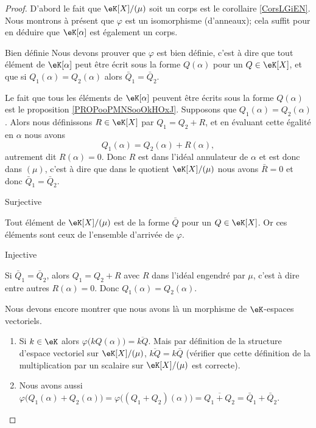 \begin{proof}
    D'abord le fait que \( \eK[X]/(\mu)\) soit un corps est le corollaire \ref{CorsLGiEN}. Nous montrons à présent que \( \varphi\) est un isomorphisme (d'anneaux); cela suffit pour en déduire que \( \eK[\alpha]\) est également un corps.
    \begin{subproof}
        \item[Bien définie]
            Nous devons prouver que \( \varphi\) est bien définie, c'est à dire que tout élément de \( \eK[\alpha]\) peut être écrit sous la forme \( Q(\alpha)\) pour un \( Q\in \eK[X]\), et que si \( Q_1(\alpha)=Q_2(\alpha)\) alors \( \bar Q_1=\bar Q_2\).
        
            Le fait que tous les éléments de \( \eK[\alpha]\) peuvent être écrits sous la forme \( Q(\alpha)\) est le proposition \ref{PROPooPMNSooOkHOxJ}. Supposons que \( Q_1(\alpha)=Q_2(\alpha)\). Alors nous définissons \( R\in \eK[X]\) par \( Q_1=Q_2+R\), et en évaluant cette égalité en \( \alpha\) nous avons
            \begin{equation}
                Q_1(\alpha)=Q_2(\alpha)+R(\alpha),
            \end{equation}
            autrement dit \( R(\alpha)=0\). Donc \( R\) est dans l'idéal annulateur de \( \alpha\) et est donc dans \( (\mu)\), c'est à dire que dans le quotient \( \eK[X]/(\mu)\) nous avons \( \bar R=0\) et donc \( \bar Q_1=\bar Q_2\).

        \item[Surjective]

            Tout élément de \( \eK[X]/(\mu)\) est de la forme \( \bar Q\) pour un \( Q\in \eK[X]\). Or ces éléments sont ceux de l'ensemble d'arrivée de \( \varphi\).

        \item[Injective]

            Si \( \bar Q_1=\bar Q_2\), alors \( Q_1=Q_2+R\) avec \( R\) dans l'idéal engendré par \( \mu\), c'est à dire entre autres \( R(\alpha)=0\). Donc \( Q_1(\alpha)=Q_2(\alpha)\).

    \end{subproof}

    Nous devons encore montrer que nous avons là un morphisme de \( \eK\)-espaces vectoriels.
    \begin{enumerate}
        \item
            Si \( k\in \eK\) alors \( \varphi\big( kQ(\alpha) \big)=\overline{ kQ }\). Mais par définition de la structure d'espace vectoriel sur \( \eK[X]/(\mu)\), \( \overline{ kQ }=k\bar Q\) (vérifier que cette définition de la multiplication par un scalaire sur \( \eK[X]/(\mu)\) est correcte).
        \item
            Nous avons aussi \( \varphi\big( Q_1(\alpha)+Q_2(\alpha) \big)=\varphi\big( (Q_1+Q_2)(\alpha) \big)=\overline{ Q_1+Q_2 }=\bar Q_1+\bar Q_2\).
    \end{enumerate}
\end{proof}

